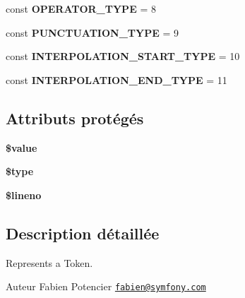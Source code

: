 \begin{DoxyCompactItemize}
\item 
const {\bfseries O\+P\+E\+R\+A\+T\+O\+R\+\_\+\+T\+Y\+PE} = 8\hypertarget{class_twig___token_a143eb58464c5398fe7aeb1d482d5822f}{}\label{class_twig___token_a143eb58464c5398fe7aeb1d482d5822f}

\item 
const {\bfseries P\+U\+N\+C\+T\+U\+A\+T\+I\+O\+N\+\_\+\+T\+Y\+PE} = 9\hypertarget{class_twig___token_a096168514425d8726b9baa79da07b24d}{}\label{class_twig___token_a096168514425d8726b9baa79da07b24d}

\item 
const {\bfseries I\+N\+T\+E\+R\+P\+O\+L\+A\+T\+I\+O\+N\+\_\+\+S\+T\+A\+R\+T\+\_\+\+T\+Y\+PE} = 10\hypertarget{class_twig___token_a74d54f60a6d271eb3b268a00b0fca731}{}\label{class_twig___token_a74d54f60a6d271eb3b268a00b0fca731}

\item 
const {\bfseries I\+N\+T\+E\+R\+P\+O\+L\+A\+T\+I\+O\+N\+\_\+\+E\+N\+D\+\_\+\+T\+Y\+PE} = 11\hypertarget{class_twig___token_a6f5d78c437002c2ab0496c6322a940fb}{}\label{class_twig___token_a6f5d78c437002c2ab0496c6322a940fb}

\end{DoxyCompactItemize}
\subsection*{Attributs protégés}
\begin{DoxyCompactItemize}
\item 
{\bfseries \$value}\hypertarget{class_twig___token_a0f298096f322952a72a50f98a74c7b60}{}\label{class_twig___token_a0f298096f322952a72a50f98a74c7b60}

\item 
{\bfseries \$type}\hypertarget{class_twig___token_a9a4a6fba2208984cabb3afacadf33919}{}\label{class_twig___token_a9a4a6fba2208984cabb3afacadf33919}

\item 
{\bfseries \$lineno}\hypertarget{class_twig___token_a865384ce49abf1c78f8aea48c7b5aa48}{}\label{class_twig___token_a865384ce49abf1c78f8aea48c7b5aa48}

\end{DoxyCompactItemize}


\subsection{Description détaillée}
Represents a Token.

\begin{DoxyAuthor}{Auteur}
Fabien Potencier \href{mailto:fabien@symfony.com}{\tt fabien@symfony.\+com} 
\end{DoxyAuthor}


